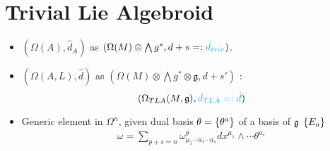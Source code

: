     
        
    
    
        
    

\section{Trivial Lie Algebroid}

{\color{gray}
\begin{itemize}
    
\item $(\Omega(A), \hat d_A)$ as $(\Omega(M)\otimes \bigwedge g^*, d + s =: \textcolor{cyan}{\hat d_{triv}})$.

\item $(\Omega(A, L), \hat d)$ as $(\Omega(M)\otimes \bigwedge g^* \otimes \mathfrak g, d + s')$ : \[(\Omega_{TLA}(M, \mathfrak g), \textcolor{cyan}{\hat d_{TLA} =: \hat d})\]

\item Generic element in $\Omega^n$, given dual basis $\theta = \left\{ \theta^a \right\}$ of a basis of $\mathfrak{g}$ $\left\{ E_a \right\}$
\begin{align*}
    \omega = \sum_{p + s = n} \omega^\theta_{\mu_1 \cdots a_1 \cdots a_s} dx^{\mu_1} \wedge \cdots \theta^{a_s}
\end{align*}
    
\end{itemize}
}
\linea

